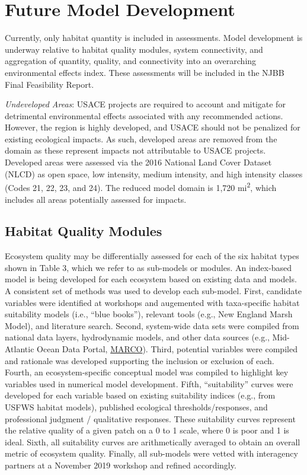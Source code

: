 \documentclass[
]{book}
\begin{document}
\hypertarget{future-model-development}{%
\section{Future Model Development}\label{future-model-development}}

Currently, only habitat quantity is included in assessments. Model development is underway relative to habitat quality modules, system connectivity, and aggregation of quantity, quality, and connectivity into an overarching environmental effects index. These assessments will be included in the NJBB Final Feasibility Report.

\emph{Undeveloped Areas}: USACE projects are required to account and mitigate for detrimental environmental effects associated with any recommended actions. However, the region is highly developed, and USACE should not be penalized for existing ecological impacts. As such, developed areas are removed from the domain as these represent impacts not attributable to USACE projects. Developed areas were assessed via the 2016 National Land Cover Dataset (NLCD) as open space, low intensity, medium intensity, and high intensity classes (Codes 21, 22, 23, and 24). The reduced model domain is 1,720 mi\textsuperscript{2}, which includes all areas potentially assessed for impacts.

\hypertarget{habitat-quality-modules}{%
\subsection{Habitat Quality Modules}\label{habitat-quality-modules}}

Ecosystem quality may be differentially assessed for each of the six habitat types shown in Table 3, which we refer to as sub-models or modules. An index-based model is being developed for each ecosystem based on existing data and models. A consistent set of methods was used to develop each sub-model. First, candidate variables were identified at workshops and augemented with taxa-specific habitat suitability models (i.e., ``blue books''), relevant tools (e.g., New England Marsh Model), and literature search. Second, system-wide data sets were compiled from national data layers, hydrodynamic models, and other data sources (e.g., Mid-Atlantic Ocean Data Portal, \href{https://portal.midatlanticocean.org/}{MARCO}). Third, potential variables were compiled and rationale was developed supporting the inclusion or exclusion of each. Fourth, an ecosystem-specific conceptual model was compiled to highlight key variables used in numerical model development. Fifth, ``suitability'' curves were developed for each variable based on existing suitability indices (e.g., from USFWS habitat models), published ecological thresholds/responses, and professional judgment / qualitative responses. These suitability curves represent the relative quality of a given patch on a 0 to 1 scale, where 0 is poor and 1 is ideal. Sixth, all suitability curves are arithmetically averaged to obtain an overall metric of ecosystem quality. Finally, all sub-models were vetted with interagency partners at a November 2019 workshop and refined accordingly.
\end{document}
